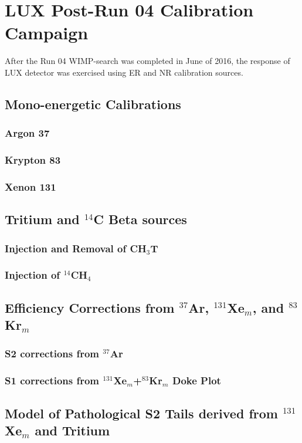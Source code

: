 \chapter{LUX Post-Run 04 Calibration Campaign}
After the Run 04 WIMP-search was completed in June of 2016, the response of LUX detector was exercised using ER and NR calibration sources. 

\section{Mono-energetic Calibrations}
\subsection{Argon 37}
\subsection{Krypton 83}
\subsection{Xenon 131}

\section{Tritium and $^{14}$C Beta sources}
\subsection{Injection and Removal of CH$_{3}$T}
\subsection{Injection of $^{14}$CH$_4$}

\section{Efficiency Corrections from $^{37}$Ar, $^{131}$Xe$_{m}$, and $^{83}$Kr$_{m}$}
\subsection{S2 corrections from $^{37}$Ar}
\subsection{S1 corrections from $^{131}$Xe$_{m}$+$^{83}$Kr$_{m}$ Doke Plot}


\section{Model of Pathological S2 Tails derived from $^{131}$Xe$_{m}$ and Tritium}